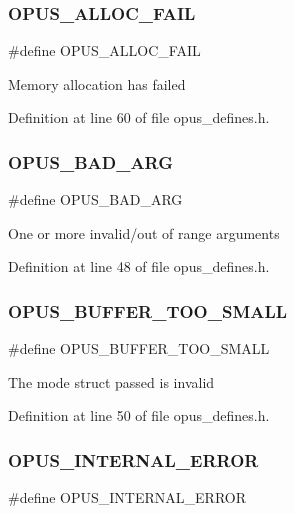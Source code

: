 \subsubsection{\texorpdfstring{OPUS\_ALLOC\_FAIL}{OPUS\_ALLOC\_FAIL}}
{\footnotesize\ttfamily \#define O\+P\+U\+S\+\_\+\+A\+L\+L\+O\+C\+\_\+\+F\+A\+IL}

Memory allocation has failed 

Definition at line 60 of file opus\+\_\+defines.\+h.

\mbox{\label{group__opus__errorcodes_gaf2d43e479455a1a3b6874e5faf4e827d}} 
\subsubsection{\texorpdfstring{OPUS\_BAD\_ARG}{OPUS\_BAD\_ARG}}
{\footnotesize\ttfamily \#define O\+P\+U\+S\+\_\+\+B\+A\+D\+\_\+\+A\+RG}

One or more invalid/out of range arguments 

Definition at line 48 of file opus\+\_\+defines.\+h.

\mbox{\label{group__opus__errorcodes_gacd897c05563ec04a67d8e92ba29f3d4f}} 
\subsubsection{\texorpdfstring{OPUS\_BUFFER\_TOO\_SMALL}{OPUS\_BUFFER\_TOO\_SMALL}}
{\footnotesize\ttfamily \#define O\+P\+U\+S\+\_\+\+B\+U\+F\+F\+E\+R\+\_\+\+T\+O\+O\+\_\+\+S\+M\+A\+LL}

The mode struct passed is invalid 

Definition at line 50 of file opus\+\_\+defines.\+h.

\mbox{\label{group__opus__errorcodes_gae1f952c366ebd380df9efa1842635a0b}} 
\subsubsection{\texorpdfstring{OPUS\_INTERNAL\_ERROR}{OPUS\_INTERNAL\_ERROR}}
{\footnotesize\ttfamily \#define O\+P\+U\+S\+\_\+\+I\+N\+T\+E\+R\+N\+A\+L\+\_\+\+E\+R\+R\+OR}

